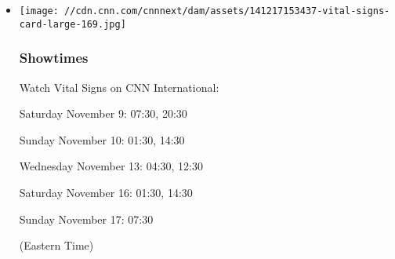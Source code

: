 \begin{itemize}
\item
  \texttt{[image: //cdn.cnn.com/cnnnext/dam/assets/141217153437-vital-signs-card-large-169.jpg]}

  \hypertarget{showtimes}{%
  \subsubsection{Showtimes}\label{showtimes}}

  Watch Vital Signs on CNN International:

  Saturday November 9: 07:30, 20:30

  Sunday November 10: 01:30, 14:30

  Wednesday November 13: 04:30, 12:30

  Saturday November 16: 01:30, 14:30

  Sunday November 17: 07:30

  (Eastern Time)
\end{itemize}

